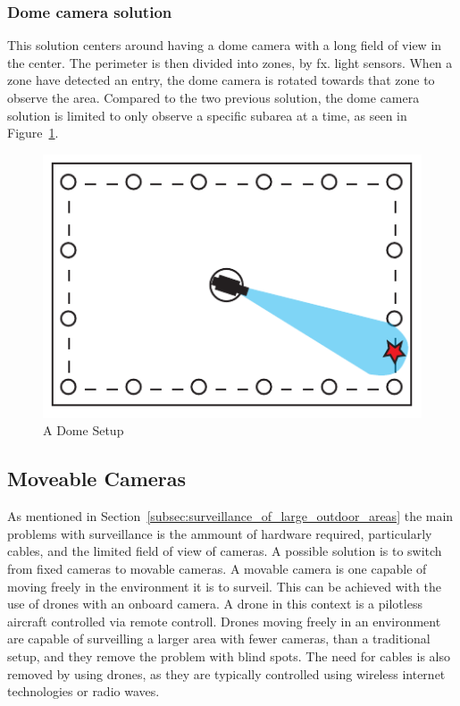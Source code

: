 \subsubsection{Dome camera solution}
This solution centers around having a dome camera with a long field of view in the center.
The perimeter is then divided into zones, by fx. light sensors.
When a zone have detected an entry, the dome camera is rotated towards that zone to observe the area.
Compared to the two previous solution, the dome camera solution is limited to only observe a specific subarea at a time, as seen in Figure~\ref{fig:drone_sensor}.
\begin{figure}[htb]
    \centering
    \includegraphics[width=\textwidth]{gfx/drome_sensor.pdf}
    \caption{A Dome Setup}
    \label{fig:drone_sensor}
\end{figure}

\subsection{Moveable Cameras}
As mentioned in Section~\ref{subsec:surveillance_of_large_outdoor_areas} the main problems with surveillance is the ammount of hardware required, particularly cables, and the limited field of view of cameras.
A possible solution is to switch from fixed cameras to movable cameras.
A movable camera is one capable of moving freely in the environment it is to surveil.
This can be achieved with the use of drones with an onboard camera.
A drone in this context is a pilotless aircraft controlled via remote controll.
Drones moving freely in an environment are capable of surveilling a larger area with fewer cameras, than a traditional setup, and they remove the problem with blind spots.
The need for cables is also removed by using drones, as they are typically controlled using wireless internet technologies or radio waves.


